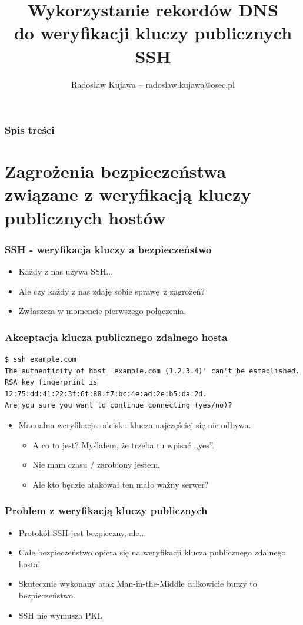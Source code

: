 \documentclass[dvipsnames,table]{beamer}
\title{Wykorzystanie rekordów DNS \\ do weryfikacji kluczy publicznych SSH}
\author{Radosław Kujawa -- radoslaw.kujawa@osec.pl}
\institute{OSEC}
\begin{document}
\begin{frame}
\titlepage
\end{frame}

\begin{frame}[allowframebreaks]
\frametitle{Spis treści}
{
\hypersetup{colorlinks=true,linkcolor=black,urlcolor=OSEC-red}
\tableofcontents
}
\end{frame}

\section{Zagrożenia bezpieczeństwa związane z weryfikacją kluczy publicznych hostów}

\begin{frame}
\frametitle{SSH - weryfikacja kluczy a bezpieczeństwo}
\begin{itemize}
	\item Każdy z nas używa SSH...
	\item Ale czy każdy z nas zdaję sobie sprawę z zagrożeń? 
	\item Zwłaszcza w momencie pierwszego połączenia.
\end{itemize}
\end{frame}

\begin{frame}[fragile]
\frametitle{Akceptacja klucza publicznego zdalnego hosta}
\scriptsize
\begin{verbatim}
$ ssh example.com
The authenticity of host 'example.com (1.2.3.4)' can't be established.
RSA key fingerprint is 12:75:dd:41:22:3f:6f:88:f7:bc:4e:ad:2e:b5:da:2d.
Are you sure you want to continue connecting (yes/no)?
\end{verbatim}
\normalsize
\begin{itemize}
	\item Manualna weryfikacja odcisku klucza najczęściej się nie odbywa.
	\begin{itemize}
		\item A co to jest? Myślałem, że trzeba tu wpisać ,,yes''.
		\item Nie mam czasu / zarobiony jestem.
		\item Ale kto będzie atakował ten mało ważny serwer?
	\end{itemize}

\end{itemize}

\end{frame}

\begin{frame}
\frametitle{Problem z weryfikacją kluczy publicznych}
\begin{itemize}
	\item Protokół SSH jest bezpieczny, ale...
	\item Całe bezpieczeństwo opiera się na weryfikacji klucza publicznego zdalnego hosta!
	\item Skutecznie wykonany atak Man-in-the-Middle całkowicie burzy to bezpieczeństwo.
	\item SSH nie wymusza PKI.
\end{itemize}
\end{frame}
\end{document}
